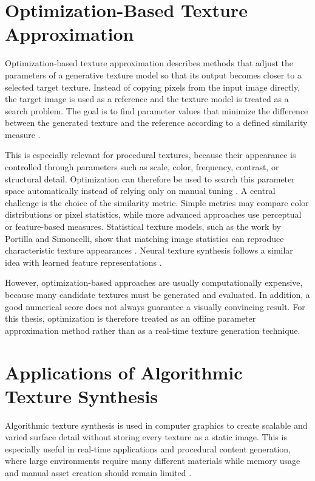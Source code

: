 \section{Optimization-Based Texture Approximation}

Optimization-based texture approximation describes methods that adjust the parameters of a generative texture model so that its output becomes closer to a selected target texture. Instead of copying pixels from the input image directly, the target image is used as a reference and the texture model is treated as a search problem. The goal is to find parameter values that minimize the difference between the generated texture and the reference according to a defined similarity measure \cite{ebert2003texturing}.

This is especially relevant for procedural textures, because their appearance is controlled through parameters such as scale, color, frequency, contrast, or structural detail. Optimization can therefore be used to search this parameter space automatically instead of relying only on manual tuning \cite{akenine2018realtime}. A central challenge is the choice of the similarity metric. Simple metrics may compare color distributions or pixel statistics, while more advanced approaches use perceptual or feature-based measures. Statistical texture models, such as the work by Portilla and Simoncelli, show that matching image statistics can reproduce characteristic texture appearances \cite{portilla2000parametric}. Neural texture synthesis follows a similar idea with learned feature representations \cite{gatys2015texture}.

However, optimization-based approaches are usually computationally expensive, because many candidate textures must be generated and evaluated. In addition, a good numerical score does not always guarantee a visually convincing result. For this thesis, optimization is therefore treated as an offline parameter approximation method rather than as a real-time texture generation technique.


\section{Applications of Algorithmic Texture Synthesis}

Algorithmic texture synthesis is used in computer graphics to create scalable and varied surface detail without storing every texture as a static image. This is especially useful in real-time applications and procedural content generation, where large environments require many different materials while memory usage and manual asset creation should remain limited \cite{akenine2018realtime, ebert2003texturing, shaker2016pcg}.

